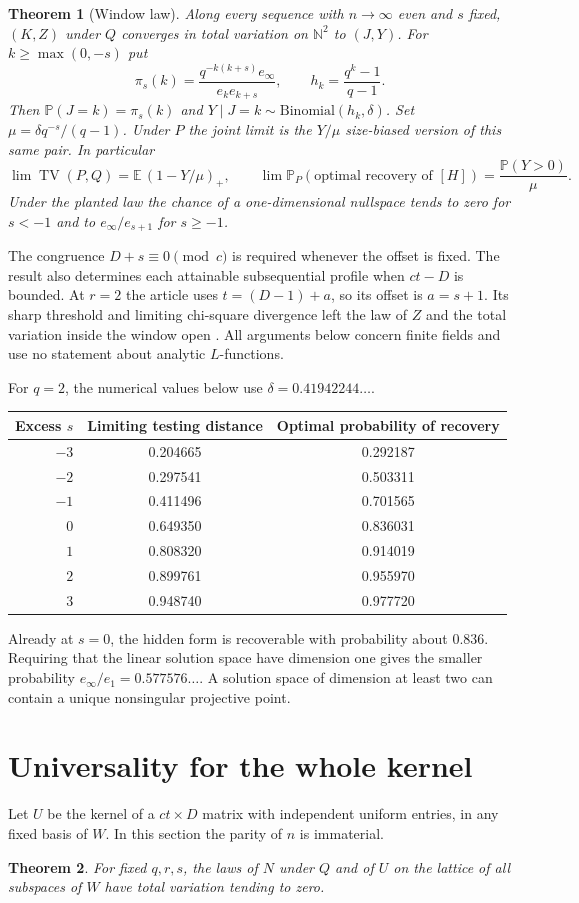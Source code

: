 \documentclass[11pt]{article}
\newtheorem{theorem}{Theorem}[section]
\newcommand{\PP}{\mathbb P}
\newcommand{\E}{\mathbb E}
\newcommand{\TV}{\operatorname{TV}}
\begin{document}
\begin{theorem}[Window law]\label{main}
Along every sequence with $n\to\infty$ even and $s$ fixed, $(K,Z)$ under $Q$ converges in total variation on $\mathbb N^2$ to $(J,Y)$. For $k\ge\max(0,-s)$ put
\[
 \pi_s(k)=\frac{q^{-k(k+s)}e_\infty}{e_k e_{k+s}},\qquad
 h_k=\frac{q^k-1}{q-1}.
\]
Then $\PP(J=k)=\pi_s(k)$ and $Y\mid J=k\sim\mathrm{Binomial}(h_k,\delta)$. Set $\mu=\delta q^{-s}/(q-1)$. Under $P$ the joint limit is the $Y/\mu$ size-biased version of this same pair. In particular
\[
 \lim\TV(P,Q)=\E\, (1-Y/\mu)_+,\qquad
 \lim\PP_P(\text{optimal recovery of }[H])=\frac{\PP(Y>0)}{\mu}.
\]
Under the planted law the chance of a one-dimensional nullspace tends to zero for $s<-1$ and to $e_\infty/e_{s+1}$ for $s\ge-1$.
\end{theorem}
The congruence $D+s\equiv0\pmod c$ is required whenever the offset is fixed. The result also determines each attainable subsequential profile when $ct-D$ is bounded. At $r=2$ the article uses $t=(D-1)+a$, so its offset is $a=s+1$. Its sharp threshold and limiting chi-square divergence left the law of $Z$ and the total variation inside the window open \cite{repo}. All arguments below concern finite fields and use no statement about analytic $L$-functions.

For $q=2$, the numerical values below use $\delta=0.41942244\ldots$.
\begin{center}
\begin{tabular}{rcc}
\toprule
Excess $s$&Limiting testing distance&Optimal probability of recovery\\
\midrule
$-3$ &0.204665&0.292187\\
$-2$ &0.297541&0.503311\\
$-1$ &0.411496&0.701565\\
$0$ &0.649350&0.836031\\
$1$ &0.808320&0.914019\\
$2$ &0.899761&0.955970\\
$3$ &0.948740&0.977720\\
\bottomrule
\end{tabular}
\end{center}
Already at $s=0$, the hidden form is recoverable with probability about $0.836$. Requiring that the linear solution space have dimension one gives the smaller probability $e_\infty/e_1=0.577576\ldots$. A solution space of dimension at least two can contain a unique nonsingular projective point.

\section{Universality for the whole kernel}
Let $U$ be the kernel of a $ct\times D$ matrix with independent uniform entries, in any fixed basis of $W$. In this section the parity of $n$ is immaterial.
\begin{theorem}\label{universality}
For fixed $q,r,s$, the laws of $N$ under $Q$ and of $U$ on the lattice of all subspaces of $W$ have total variation tending to zero.
\end{theorem}
\end{document}
